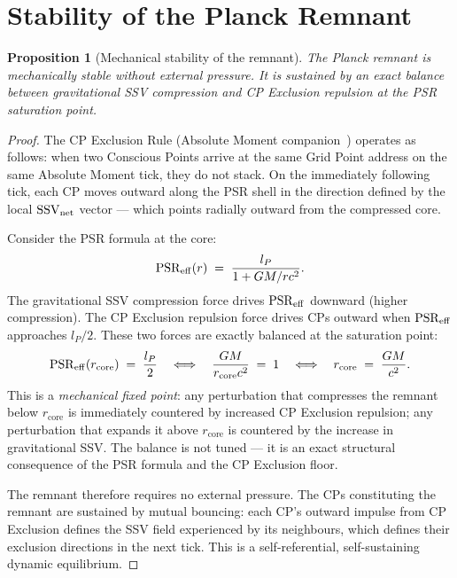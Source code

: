 \documentclass[12pt]{article}
\newtheorem{proposition}[theorem]{Proposition}
\newcommand{\lP}{l_P}
\newcommand{\rcore}{r_{\mathrm{core}}}
\newcommand{\PSR}{\mathrm{PSR}}
\newcommand{\SSV}{\mathrm{SSV}}
\begin{document}
\section{Stability of the Planck Remnant}
\label{sec:stability}

\begin{proposition}[Mechanical stability of the remnant]
\label{prop:stability}
The Planck remnant is mechanically stable without external pressure.
It is sustained by an exact balance between gravitational SSV
compression and CP Exclusion repulsion at the PSR saturation point.
\end{proposition}

\begin{proof}
The CP Exclusion Rule (Absolute Moment companion~\cite{c1}) operates
as follows: when two Conscious Points arrive at the same Grid Point
address on the same Absolute Moment tick, they do not stack.  On the
immediately following tick, each CP moves outward along the PSR shell
in the direction defined by the local $\SSV_{\rm net}$ vector — which
points radially outward from the compressed core.

Consider the PSR formula at the core:
\begin{equation}
  \PSR_{\rm eff}(r) \;=\; \frac{\lP}{1 + GM/rc^2}.
  \label{eq:psr_core}
\end{equation}
The gravitational SSV compression force drives $\PSR_{\rm eff}$ downward
(higher compression).  The CP Exclusion repulsion force drives CPs
outward when $\PSR_{\rm eff}$ approaches $\lP/2$.  These two forces
are exactly balanced at the saturation point:
\begin{equation}
  \PSR_{\rm eff}(\rcore) \;=\; \frac{\lP}{2}
  \quad\Longleftrightarrow\quad
  \frac{GM}{\rcore c^2} \;=\; 1
  \quad\Longleftrightarrow\quad
  \rcore \;=\; \frac{GM}{c^2}.
  \label{eq:saturation}
\end{equation}
This is a \emph{mechanical fixed point}: any perturbation that
compresses the remnant below $\rcore$ is immediately countered by
increased CP Exclusion repulsion; any perturbation that expands it
above $\rcore$ is countered by the increase in gravitational SSV.
The balance is not tuned — it is an exact structural consequence of
the PSR formula and the CP Exclusion floor.

The remnant therefore requires no external pressure.  The CPs
constituting the remnant are sustained by mutual bouncing:
each CP's outward impulse from CP Exclusion defines the SSV field
experienced by its neighbours, which defines their exclusion
directions in the next tick.  This is a self-referential,
self-sustaining dynamic equilibrium.
\end{proof}
\end{document}
